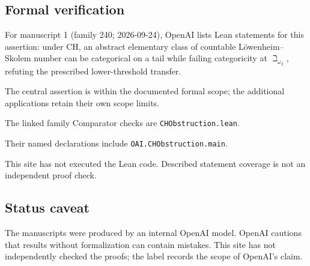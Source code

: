 \documentclass[11pt]{article}
\begin{document}
\subsection{Formal verification}
For manuscript 1 (family 240; 2026-09-24), OpenAI lists Lean statements for this assertion: under CH, an abstract elementary class of countable L\"owenheim--Skolem number can be categorical on a tail while failing categoricity at $\beth_{\omega_2}$, refuting the prescribed lower-threshold transfer.

The central assertion is within the documented formal scope; the additional applications retain their own scope limits.

The linked family Comparator checks are \texttt{CHObstruction.lean}.

Their named declarations include \texttt{OAI.CHObstruction.main}.

This site has not executed the Lean code. Described statement coverage is not an independent proof check.

\subsection{Status caveat}
The manuscripts were produced by an internal OpenAI model. OpenAI cautions that results without formalization can contain mistakes. This site has not independently checked the proofs; the label records the scope of OpenAI's claim.
\end{document}
